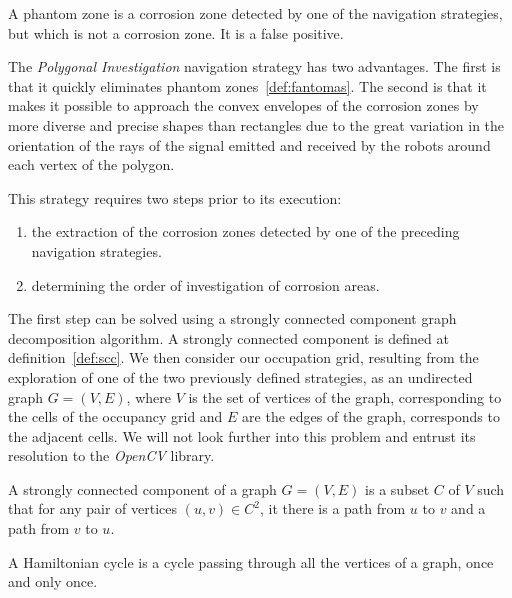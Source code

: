 \begin{definition}
	\label{def:fantomas}
	A phantom zone is a corrosion zone detected by one of the navigation strategies, but which is not a corrosion zone. It is a false positive.
\end{definition}

The \textit{Polygonal Investigation} navigation strategy has two advantages.
The first is that it quickly eliminates phantom zones~\ref{def:fantomas}.
The second is that it makes it possible to approach the convex envelopes of the corrosion zones by more diverse and precise shapes than rectangles due to the great variation in the orientation of the rays of the signal emitted and received by the robots around each vertex of the polygon.

This strategy requires two steps prior to its execution:
\begin{enumerate}
	\item the extraction of the corrosion zones detected by one of the preceding navigation strategies.
	\item determining the order of investigation of corrosion areas.
\end{enumerate}

The first step can be solved using a strongly connected component graph decomposition algorithm.
A strongly connected component is defined at definition~\ref{def:scc}.
We then consider our occupation grid, resulting from the exploration of one of the two previously defined strategies, as an undirected graph $G = (V, E)$, where $V$ is the set of vertices of the graph, corresponding to the cells of the occupancy grid and $E$ are the edges of the graph, corresponds to the adjacent cells.
We will not look further into this problem and entrust its resolution to the \textit{OpenCV} library.

\begin{definition}
	\label{def:scc}
	A strongly connected component of a graph $G = (V, E)$ is a subset $C$ of $V$ such that for any pair of vertices $(u, v) \in C^2$, it there is a path from $u$ to $v$ and a path from $v$ to $u$.
\end{definition}

\begin{definition}
	\label{def:hamilton}
	A Hamiltonian cycle is a cycle passing through all the vertices of a graph, once and only once.
\end{definition}

